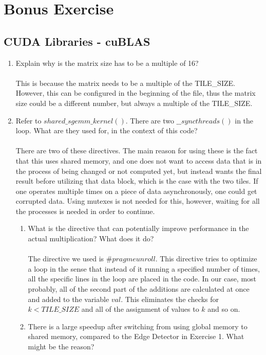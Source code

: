 \documentclass[english]{exam}
\begin{document}
\clearpage
\chapter{Bonus Exercise}
\section*{CUDA Libraries - cuBLAS}

\begin{enumerate}
\item Explain why is the matrix size has to be a multiple of 16? \\\\
  This is because the matrix needs to be a multiple of the TILE\_SIZE. However, this can be configured in the beginning of the file, thus the matrix size could be a different number, but always a multiple of the TILE\_SIZE.
\item Refer to $shared\_sgemm\_kernel()$. There are two $\_\_syncthreads()$ in the loop. What are they used for, in the context of this code?\\\\
  There are two of these directives. The main reason for using these is the fact that this uses shared memory, and one does not want to access data that is in the process of being changed or not computed yet, but instead wants the final result before utilizing that data block, which is the case with the two tiles. If one operates multiple times on a piece of data asynchronously, one could get corrupted data. Using mutexes is not needed for this, however, waiting for all the processes is needed in order to continue.
  \begin{enumerate}
  \item What is the directive that can potentially improve performance in the actual multiplication? What does it do?\\\\
    The directive we used is $\#pragme unroll$. This directive tries to optimize a loop in the sense that instead of it running a specified number of times, all the specific lines in the loop are placed in the code. In our case, most probably, all of the second part of the additions are calculated at once and added to the variable $val$. This eliminates the checks for $k < TILE\_SIZE$ and all of the assignment of values to $k$ and so on.
  \item There is a large speedup after switching from using global memory to shared memory, compared to the Edge Detector in Exercise 1. What might be the reason?\\\\

\end{enumerate}
\end{enumerate}
\end{document}
